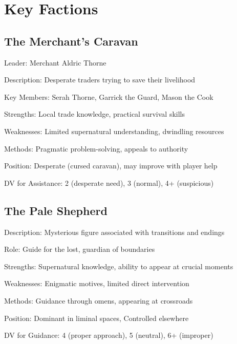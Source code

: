 \documentclass[11pt]{article}
\newenvironment{faction}[1]{\begin{description}[leftmargin=*,style=standard]\item[\textbf{#1}]}{\end{description}}
\begin{document}
\section{Key Factions}

\subsection{The Merchant's Caravan}
\begin{faction}{The Merchant's Caravan}
\item[Leader:] Merchant Aldric Thorne
\item[Description:] Desperate traders trying to save their livelihood
\item[Key Members:] Serah Thorne, Garrick the Guard, Mason the Cook
\item[Strengths:] Local trade knowledge, practical survival skills
\item[Weaknesses:] Limited supernatural understanding, dwindling resources
\item[Methods:] Pragmatic problem-solving, appeals to authority
\item[Position:] Desperate (cursed caravan), may improve with player help
\item[DV for Assistance:] 2 (desperate need), 3 (normal), 4+ (suspicious)
\end{faction}

\subsection{The Pale Shepherd}
\begin{faction}{The Pale Shepherd}
\item[Description:] Mysterious figure associated with transitions and endings
\item[Role:] Guide for the lost, guardian of boundaries
\item[Strengths:] Supernatural knowledge, ability to appear at crucial moments
\item[Weaknesses:] Enigmatic motives, limited direct intervention
\item[Methods:] Guidance through omens, appearing at crossroads
\item[Position:] Dominant in liminal spaces, Controlled elsewhere
\item[DV for Guidance:] 4 (proper approach), 5 (neutral), 6+ (improper)
\end{faction}
\end{document}
